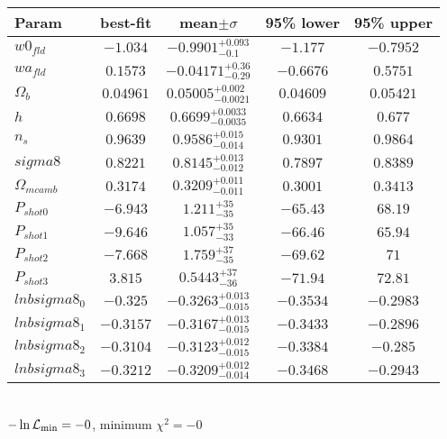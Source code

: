 \begin{tabular}{|l|c|c|c|c|} 
 \hline 
Param & best-fit & mean$\pm\sigma$ & 95\% lower & 95\% upper \\ \hline 
$w0_{fld }$ &$-1.034$ & $-0.9901_{-0.1}^{+0.093}$ & $-1.177$ & $-0.7952$ \\ 
$wa_{fld }$ &$0.1573$ & $-0.04171_{-0.29}^{+0.36}$ & $-0.6676$ & $0.5751$ \\ 
$\Omega{}_{b }$ &$0.04961$ & $0.05005_{-0.0021}^{+0.002}$ & $0.04609$ & $0.05421$ \\ 
$h$ &$0.6698$ & $0.6699_{-0.0035}^{+0.0033}$ & $0.6634$ & $0.677$ \\ 
$n_{s }$ &$0.9639$ & $0.9586_{-0.014}^{+0.015}$ & $0.9301$ & $0.9864$ \\ 
$sigma8$ &$0.8221$ & $0.8145_{-0.012}^{+0.013}$ & $0.7897$ & $0.8389$ \\ 
$\Omega{}_{m camb }$ &$0.3174$ & $0.3209_{-0.011}^{+0.011}$ & $0.3001$ & $0.3413$ \\ 
$P_{shot0 }$ &$-6.943$ & $1.211_{-35}^{+35}$ & $-65.43$ & $68.19$ \\ 
$P_{shot1 }$ &$-9.646$ & $1.057_{-33}^{+35}$ & $-66.46$ & $65.94$ \\ 
$P_{shot2 }$ &$-7.668$ & $1.759_{-35}^{+37}$ & $-69.62$ & $71$ \\ 
$P_{shot3 }$ &$3.815$ & $0.5443_{-36}^{+37}$ & $-71.94$ & $72.81$ \\ 
$lnbsigma8_{0 }$ &$-0.325$ & $-0.3263_{-0.015}^{+0.013}$ & $-0.3534$ & $-0.2983$ \\ 
$lnbsigma8_{1 }$ &$-0.3157$ & $-0.3167_{-0.015}^{+0.013}$ & $-0.3433$ & $-0.2896$ \\ 
$lnbsigma8_{2 }$ &$-0.3104$ & $-0.3123_{-0.015}^{+0.012}$ & $-0.3384$ & $-0.285$ \\ 
$lnbsigma8_{3 }$ &$-0.3212$ & $-0.3209_{-0.014}^{+0.012}$ & $-0.3468$ & $-0.2943$ \\ 
\hline 
 \end{tabular} \\ 
$-\ln{\cal L}_\mathrm{min} =-0$, minimum $\chi^2=-0$ \\ 
